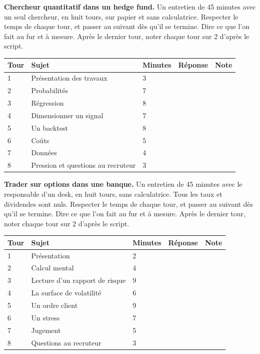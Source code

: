 \begin{question}\label{iq:iv2:mock-interviews:2}
\textbf{Chercheur quantitatif dans un hedge fund.} Un entretien de 45 minutes avec un seul chercheur, en huit tours, sur papier et sans calculatrice. Respecter le temps de chaque tour, et passer au suivant dès qu'il se termine. Dire ce que l'on fait au fur et à mesure. Après le dernier tour, noter chaque tour sur 2 d'après le script.

\medskip
\begin{tabular}{@{}l|l|l|l|l@{}}
Tour & Sujet & Minutes & Réponse & Note \\ \hline
1 & Présentation des travaux & 3 & & \\[6pt]\hline
2 & Probabilités & 7 & & \\[6pt]\hline
3 & Régression & 8 & & \\[6pt]\hline
4 & Dimensionner un signal & 7 & & \\[6pt]\hline
5 & Un backtest & 8 & & \\[6pt]\hline
6 & Coûts & 5 & & \\[6pt]\hline
7 & Données & 4 & & \\[6pt]\hline
8 & Pression et questions au recruteur & 3 & & \\[6pt]\hline
\end{tabular}
\end{question}

\vfill\clearpage
\begin{question}\label{iq:iv2:mock-interviews:3}
\textbf{Trader sur options dans une banque.} Un entretien de 45 minutes avec le responsable d'un desk, en huit tours, sans calculatrice. Tous les taux et dividendes sont nuls. Respecter le temps de chaque tour, et passer au suivant dès qu'il se termine. Dire ce que l'on fait au fur et à mesure. Après le dernier tour, noter chaque tour sur 2 d'après le script.

\medskip
\begin{tabular}{@{}l|l|l|l|l@{}}
Tour & Sujet & Minutes & Réponse & Note \\ \hline
1 & Présentation & 2 & & \\[6pt]\hline
2 & Calcul mental & 4 & & \\[6pt]\hline
3 & Lecture d'un rapport de risque & 9 & & \\[6pt]\hline
4 & La surface de volatilité & 6 & & \\[6pt]\hline
5 & Un ordre client & 9 & & \\[6pt]\hline
6 & Un stress & 7 & & \\[6pt]\hline
7 & Jugement & 5 & & \\[6pt]\hline
8 & Questions au recruteur & 3 & & \\[6pt]\hline
\end{tabular}
\end{question}

